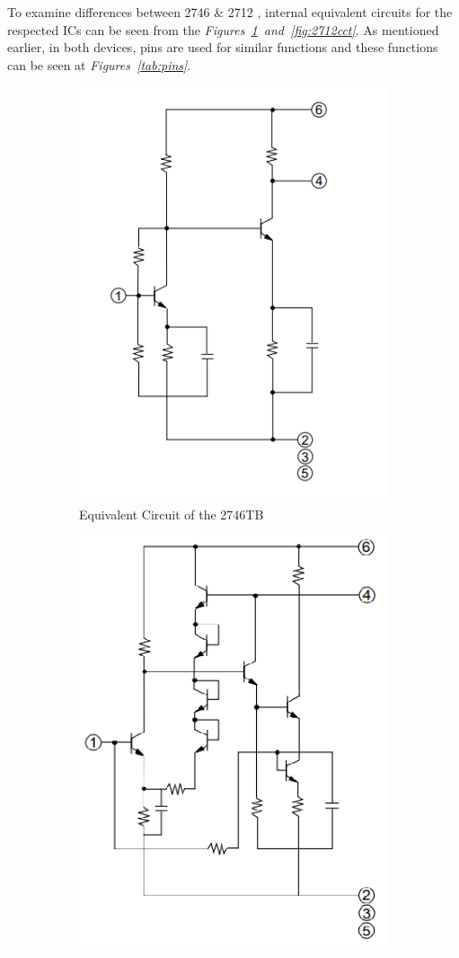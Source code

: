 	To examine differences between 2746 \& 2712 , internal equivalent circuits for the respected ICs can be seen from the \textit{Figures~\ref{fig:2746cct}~and~\ref{fig:2712cct}}. As mentioned earlier, in both devices, pins are used for similar functions and these functions can be seen at \textit{Figures~\ref{tab:pins}}.  
	

	
\begin{figure}[H]
	\setlength{\unitlength}{\textwidth} 
	\centering
	\begin{subfigure}{.5\textwidth}
  		\centering
  		\includegraphics[width=0.3\unitlength]{2746_cct}
  		\caption{\label{fig:2746cct}Equivalent Circuit of the 2746TB}
	\end{subfigure}%
	\begin{subfigure}{.5\textwidth}
  		\centering
		\includegraphics[width=0.3\unitlength]{2712_cct}

\end{subfigure}
\end{figure}
